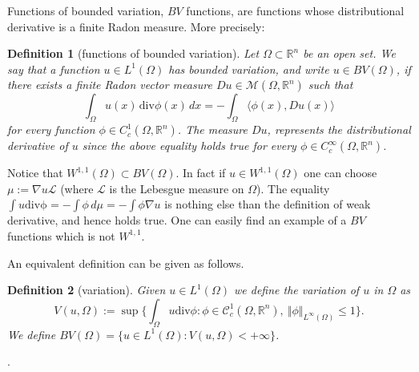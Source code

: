 \documentclass[12pt]{article}
\newcommand{\R}{\mathbb R}
\newtheorem{definition}{Definition}
\theoremstyle{remark}
\begin{document}
Functions of bounded variation, $BV$ functions, are functions whose distributional derivative is a finite Radon measure. More precisely:

\begin{definition}[functions of bounded variation]
Let $\Omega\subset \R^n$ be an open set. We say that a function $u\in L^1(\Omega)$ 
has \emph{bounded variation}, and write $u\in BV(\Omega)$, if there exists a finite Radon vector measure $Du\in\mathcal M(\Omega,\R^n)$ such that
\[
  \int_\Omega u(x)\,\mathrm{div}\phi(x)\, dx = - \int_\Omega \langle \phi(x), Du(x)\rangle
\] 
for every function $\phi\in C_c^1(\Omega,\R^n)$. The measure $Du$, 
represents the distributional derivative of $u$ since the above equality holds true for every $\phi\in C^\infty_c(\Omega,\R^n)$.
\end{definition}

Notice that $W^{1,1}(\Omega)\subset BV(\Omega)$. In fact if $u\in W^{1,1}(\Omega)$ one can choose $\mu:=\nabla u\mathcal L$ (where $\mathcal L$ is the Lebesgue measure on $\Omega$). 
The equality $\int u\mathrm{div \phi} = -\int \phi\, d\mu
= -\int \phi \nabla u$ 
is nothing else than the definition of weak derivative, and hence holds true.
One can easily find an example of a $BV$ functions which is not $W^{1,1}$.

An equivalent definition can be given as follows. 
\begin{definition}[variation]
Given $u\in L^1(\Omega)$ we define the \emph{variation} of $u$ in $\Omega$ as
\[
  V(u,\Omega):=\sup\{\int_\Omega u\mathrm{div}\phi\colon \phi\in\mathcal C_c^1(\Omega,\R^n),\ \Vert \phi\Vert_{L^\infty(\Omega)}\le 1\}.
\]
We define $BV(\Omega)=\{ u\in L^1(\Omega)\colon V(u,\Omega)<+\infty\}$.
\end{definition}.
\end{document}
